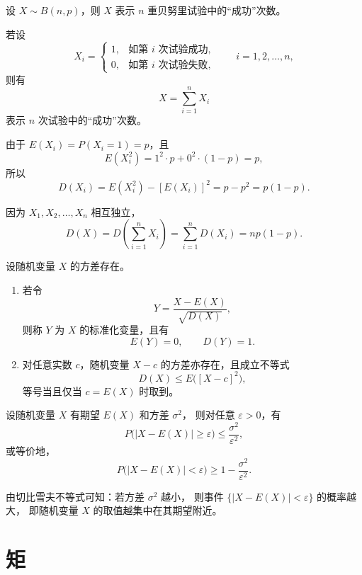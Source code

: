 \begin{example}[二项分布的方差]
设 $X \sim B(n,p)$，则 $X$ 表示 $n$ 重贝努里试验中的“成功”次数。

若设
\[
X_i=
\begin{cases}
1, & \text{如第 $i$ 次试验成功},\\[4pt]
0, & \text{如第 $i$ 次试验失败},
\end{cases}
\qquad i=1,2,\ldots,n,
\]
则有
\[
X=\sum_{i=1}^{n} X_i
\]
表示 $n$ 次试验中的“成功”次数。

由于 $E(X_i)=P(X_i=1)=p$，且
\[
E(X_i^2)=1^2\cdot p+0^2\cdot(1-p)=p,
\]
所以
\[
D(X_i)=E(X_i^2)-[E(X_i)]^2=p-p^2=p(1-p).
\]

因为 $X_1,X_2,\ldots,X_n$ 相互独立，
\[
D(X)=D\!\left(\sum_{i=1}^{n}X_i\right)=\sum_{i=1}^{n}D(X_i)=np(1-p).
\]
\end{example}
\begin{theorem}
设随机变量 $X$ 的方差存在。

\begin{enumerate}[(1)]
  \item 若令
  \[
  Y=\frac{X-E(X)}{\sqrt{D(X)}},
  \]
  则称 $Y$ 为 $X$ 的标准化变量，且有
  \[
  E(Y)=0,\qquad D(Y)=1.
  \]

  \item 对任意实数 $c$，随机变量 $X-c$ 的方差亦存在，且成立不等式
  \[
  D(X)\le E\!\big([X-c]^2\big),
  \]
  等号当且仅当 $c=E(X)$ 时取到。
\end{enumerate}
\end{theorem}
\begin{definition}[切比雪夫不等式]
设随机变量 $X$ 有期望 $E(X)$ 和方差 $\sigma^2$，  
则对任意 $\varepsilon>0$，有
\[
P\big(|X-E(X)|\ge\varepsilon\big)\le\frac{\sigma^2}{\varepsilon^2},
\]
或等价地，
\[
P\big(|X-E(X)|<\varepsilon\big)\ge 1-\frac{\sigma^2}{\varepsilon^2}.
\]

\end{definition}

\begin{note}
由切比雪夫不等式可知：若方差 $\sigma^2$ 越小，  
则事件 $\{|X-E(X)|<\varepsilon\}$ 的概率越大，  
即随机变量 $X$ 的取值越集中在其期望附近。
\end{note}
\section{矩}

